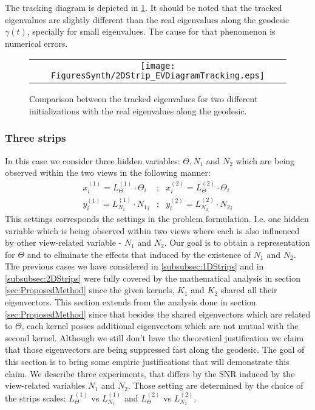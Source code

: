 \documentclass[]{article}
\theoremstyle{definition}
\begin{document}
	The tracking diagram is depicted in \ref{fig:2DStrip_EVDiagramTracking}.
	It should be noted that the tracked eigenvalues are slightly different than the real eigenvalues along the geodesic $\gamma(t)$, specially for small eigenvalues. The cause for that phenomenon is numerical errors.
	\begin{figure}[H]\centering
		\begin{tabular}{c}
			\hspace{-0.1in} \texttt{[image: FiguresSynth/2DStrip\_EVDiagramTracking.eps]}
		\end{tabular}
		\caption {Comparison between the tracked eigenvalues for two different initializations with the real eigenvalues along the geodesic.}
		\label{fig:2DStrip_EVDiagramTracking}
	\end{figure}
	
	
	\subsubsection{Three strips}
	\label{subsubsec:3DStrips}
	In this case we consider three hidden variables: $\Theta, N_1$ and $N_2$ which are being observed within the two views in the following manner:
	\begin{eqnarray*}
		\label{eq:2DStripData}
		x^{(1)}_i=L^{(1)}_\Theta \cdot \Theta_i  &;& x^{(2)}_i=L^{(2)}_\Theta \cdot \Theta_i\\ 
		y^{(1)}_i=L^{(1)}_{N_1} \cdot {N_1}_i &;& y^{(2)}_i=L^{(2)}_{N_2} \cdot {N_2}_i 
	\end{eqnarray*}
	This settings corresponds the settings in the problem formulation. I.e. one hidden variable which is being observed within two views where each is also influenced by other view-related variable - $N_1$ and $N_2$. Our goal is to obtain a representation for $\Theta$ and to eliminate the effects that induced by the existence of $N_1$ and $N_2$.
	The previous cases we have considered in \ref{subsubsec:1DStrips} and in \ref{subsubsec:2DStrips} were fully covered by the mathematical analysis in section \ref{sec:ProposedMethod} since the given kernels, $K_1$ and $K_2$ shared all their eigenvectors. This section extends from the analysis done in section \ref{sec:ProposedMethod} since that besides the shared eigenvectors which are related to $\Theta$, each kernel posses additional eigenvectors which are not mutual with the second kernel. Although we still don't have the theoretical justification we claim that those eigenvectors are being suppressed fast along the geodesic. The goal of this section is to bring some empiric justifications that will demonstrate this claim.
	We describe three experiments, that differs by the SNR induced by the view-related variables $N_1$ and $N_2$. Those setting are determined by the choice of the strips scales: $L^{(1)}_\Theta$ vs $L^{(1)}_{N_1}$ and $L^{(2)}_\Theta$ vs $L^{(2)}_{N_2}$.
	
\end{document}
